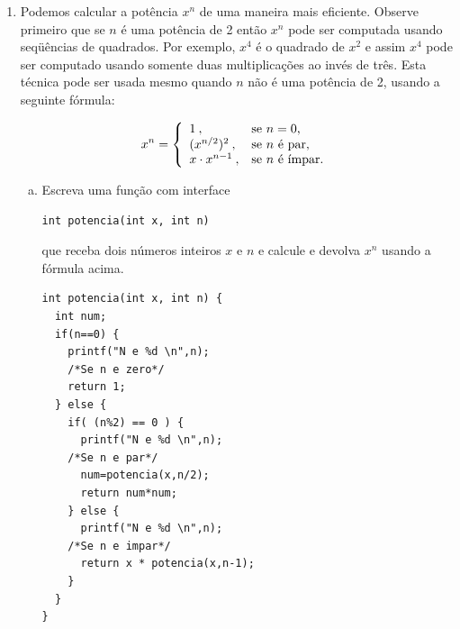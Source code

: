 \documentclass[a4paper,10pt]{article}
\begin{document}
\begin{enumerate}
\begin{lstlisting}
int ciclo(int n){
  int ciclo=1;
  while(n!=1) {
    if(n%2==0) {
      printf("%d ",n/2);
      n=n/2;
    } else {
      printf("%d ",n*3+1);
      n=n*3+1;
    }
    ciclo++;
  }
  return ciclo;
}
int cicloR(int n){
  if(n%2==0) {
    printf("%d ",n/2);
    n=n/2;
  } else {
    printf("%d ",n*3+1);
    n= n*3+1;
  }
  if(n==1) {
    return 2;
  } else {
    return 1+cicloR(n);
  }
}

int main(void)
{
  int x, saida;
  scanf("%d",&x);
  saida=ciclo(x);
  printf("\niterativo %d\n",saida);
  saida=cicloR(x);
  printf("\nrecursivo %d\n",saida);
  return 0;
}
\end{lstlisting}
\pagebreak


\item Podemos calcular a potência $x^n$ de uma maneira mais eficiente.
Observe primeiro que se $n$ é uma potência de 2 então $x^n$ pode ser computada usando seqüências de quadrados.
Por exemplo, $x^4$ é o quadrado de $x^2$ e assim $x^4$ pode ser computado usando somente duas multiplicações 
ao invés de três. Esta técnica pode ser usada mesmo quando $n$ não é uma potência de 2, usando a seguinte fórmula:


\[    x^n = \left \{ \begin{array}{ll}
        1\:, & \textnormal{se $n = 0$,} \\
        (x^{n/2})^2\:, & \textnormal{se $n$ é par,} \\
        x \cdot x^{n-1}\:, & \textnormal{se $n$ é ímpar.}
      \end{array} \right. \]

  
  
  
  
  \begin{enumerate}[(a)]
  \item Escreva uma função com interface

\begin{lstlisting}
int potencia(int x, int n)
\end{lstlisting}

que receba dois números inteiros $x$ e $n$ e calcule e devolva $x^n$ usando a fórmula acima.

\begin{lstlisting}
int potencia(int x, int n) {
  int num;
  if(n==0) {
    printf("N e %d \n",n);
    /*Se n e zero*/
    return 1;
  } else {
    if( (n%2) == 0 ) {
      printf("N e %d \n",n);
    /*Se n e par*/
      num=potencia(x,n/2);
      return num*num;
    } else {
      printf("N e %d \n",n);
    /*Se n e impar*/
      return x * potencia(x,n-1);
    }
  }
}
\end{lstlisting}


\end{enumerate}
\end{enumerate}
\end{document}
